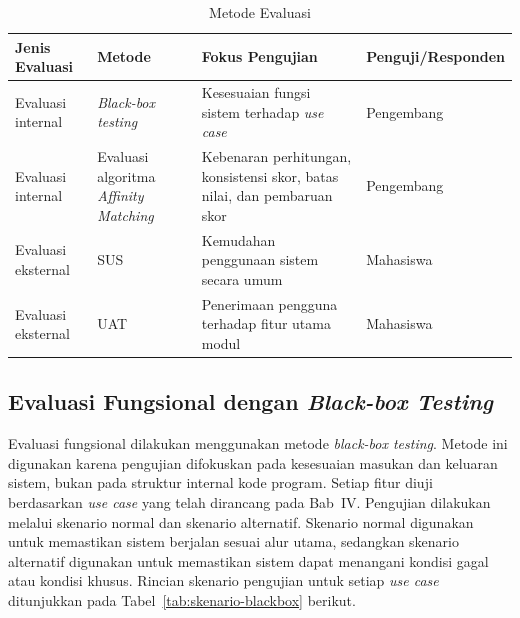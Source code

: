 \begin{table}[H]
  \caption{Metode Evaluasi}
  \label{tab:metode-evaluasi}
  \begin{tabularx}{\textwidth}{p{2.5cm} p{3.5cm} p{4cm} X}
    \toprule
    \textbf{Jenis Evaluasi} & \textbf{Metode} & \textbf{Fokus Pengujian} & \textbf{Penguji/Responden} \\
    \midrule
    Evaluasi internal & \emph{Black-box testing} & Kesesuaian fungsi sistem terhadap \emph{use case} & Pengembang \\
    \midrule
    Evaluasi internal & Evaluasi algoritma \emph{Affinity Matching} & Kebenaran perhitungan, konsistensi skor, batas nilai, dan pembaruan skor & Pengembang \\
    \midrule
    Evaluasi eksternal & SUS & Kemudahan penggunaan sistem secara umum & Mahasiswa \\
    \midrule
    Evaluasi eksternal & UAT & Penerimaan pengguna terhadap fitur utama modul & Mahasiswa \\
    \bottomrule
  \end{tabularx}
\end{table}

\subsection{Evaluasi Fungsional dengan \emph{Black-box Testing}}
\label{subsec:blackbox}

Evaluasi fungsional dilakukan menggunakan metode \emph{black-box testing}. Metode ini digunakan karena pengujian difokuskan pada kesesuaian masukan dan keluaran sistem, bukan pada struktur internal kode program. Setiap fitur diuji berdasarkan \emph{use case} yang telah dirancang pada Bab~IV. Pengujian dilakukan melalui skenario normal dan skenario alternatif. Skenario normal digunakan untuk memastikan sistem berjalan sesuai alur utama, sedangkan skenario alternatif digunakan untuk memastikan sistem dapat menangani kondisi gagal atau kondisi khusus. Rincian skenario pengujian untuk setiap \emph{use case} ditunjukkan pada Tabel~\ref{tab:skenario-blackbox} berikut.

